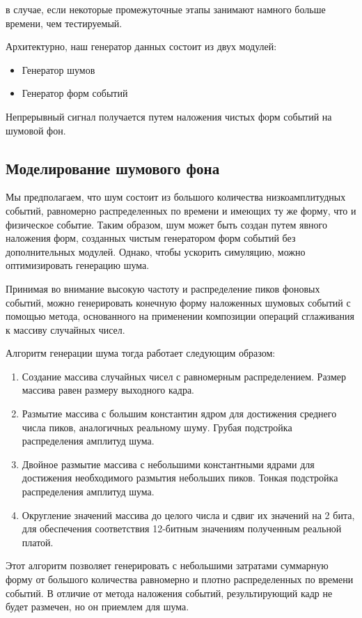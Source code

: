 \documentclass[a4paper,14pt]{extreport}
\begin{document}
в случае, если некоторые промежуточные этапы занимают намного больше времени, чем тестируемый. 

Архитектурно, наш генератор данных состоит из двух модулей:

\begin{itemize}
    \item Генератор шумов
    \item Генератор форм событий
\end{itemize}
Непрерывный сигнал получается путем наложения чистых форм событий на шумовой фон.

\subsection{Моделирование шумового фона}

Мы предполагаем, что шум состоит из большого количества низкоамплитудных событий, равномерно распределенных по времени и имеющих ту же форму, что и физическое событие. Таким образом, шум может быть создан путем явного наложения форм, созданных чистым генератором форм событий без дополнительных модулей. Однако, чтобы ускорить симуляцию, можно оптимизировать генерацию шума.

Принимая во внимание высокую частоту и распределение пиков фоновых событий, можно генерировать конечную форму наложенных шумовых событий с помощью метода, основанного на применении композиции операций сглаживания к массиву случайных чисел.

Алгоритм генерации шума тогда работает следующим образом:

\begin{enumerate}
    \item Создание массива случайных чисел с равномерным распределением. Размер массива равен размеру выходного кадра.
    \item Размытие массива с большим константин ядром для достижения среднего числа пиков, аналогичных реальному шуму. Грубая подстройка распределения амплитуд шума.
    \item Двойное размытие массива с небольшими константными ядрами для достижения необходимого размытия небольших пиков. Тонкая подстройка распределения амплитуд шума.
    \item Округление значений массива до целого числа и сдвиг их значений на 2 бита, для обеспечения соответствия 12-битным значениям полученным реальной платой.
\end{enumerate}
Этот алгоритм позволяет генерировать с небольшими затратами суммарную форму от большого количества равномерно и плотно распределенных по времени событий. В отличие от метода наложения событий, результирующий кадр не будет размечен, но он приемлем для шума.
\end{document}
